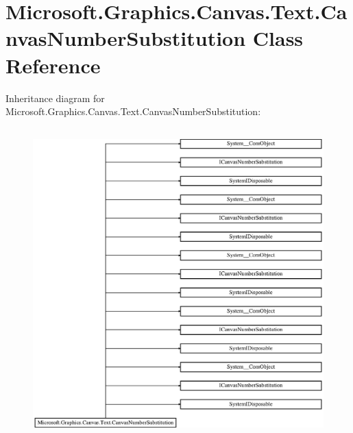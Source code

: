 \hypertarget{class_microsoft_1_1_graphics_1_1_canvas_1_1_text_1_1_canvas_number_substitution}{}\section{Microsoft.\+Graphics.\+Canvas.\+Text.\+Canvas\+Number\+Substitution Class Reference}
\label{class_microsoft_1_1_graphics_1_1_canvas_1_1_text_1_1_canvas_number_substitution}
Inheritance diagram for Microsoft.\+Graphics.\+Canvas.\+Text.\+Canvas\+Number\+Substitution\+:\begin{figure}[H]
\begin{center}
\leavevmode
\includegraphics[height=12.000000cm]{class_microsoft_1_1_graphics_1_1_canvas_1_1_text_1_1_canvas_number_substitution}
\end{center}
\end{figure}

